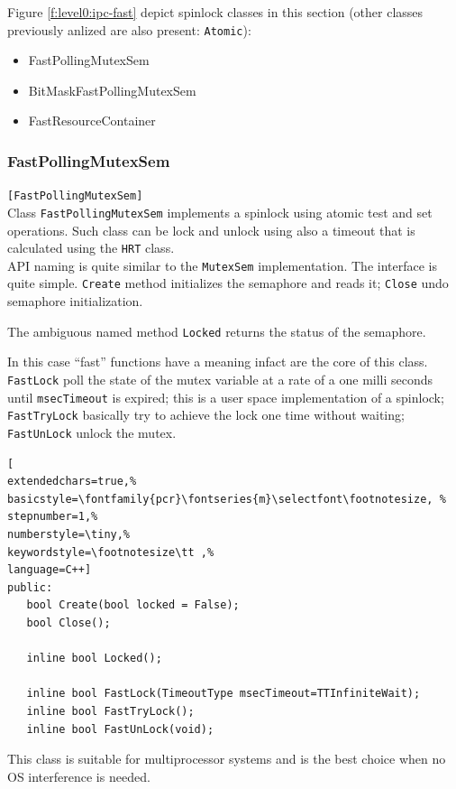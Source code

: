 Figure \ref{f:level0:ipc-fast} depict spinlock classes in this section (other classes previously anlized are also present: \texttt{Atomic}):

\begin{itemize}
 \item FastPollingMutexSem
 \item BitMaskFastPollingMutexSem
 \item FastResourceContainer
\end{itemize}




\subsubsection{FastPollingMutexSem}
\texttt{[FastPollingMutexSem]}\\
Class \texttt{FastPollingMutexSem} implements a spinlock using atomic test and set operations. Such class can be lock and unlock using also a timeout that is calculated using the \texttt{HRT} class.\\


API naming is quite similar to the \texttt{MutexSem} implementation. The interface is quite simple. \texttt{Create} method initializes the semaphore and reads it; \texttt{Close} undo semaphore initialization. 

The ambiguous named method \texttt{Locked} returns the status of the semaphore.

In this case ``fast'' functions have a meaning infact are the core of this class. \texttt{FastLock} poll the state of the mutex variable at a rate of a one milli seconds until \texttt{msecTimeout} is expired; this is a user space implementation of a spinlock; \texttt{FastTryLock} basically try to achieve the lock one time without waiting; \texttt{FastUnLock} unlock the mutex.

\begin{lstlisting}[
extendedchars=true,%
basicstyle=\fontfamily{pcr}\fontseries{m}\selectfont\footnotesize, %
stepnumber=1,%
numberstyle=\tiny,%
keywordstyle=\footnotesize\tt ,%
language=C++]
public:
   bool Create(bool locked = False);
   bool Close();

   inline bool Locked();

   inline bool FastLock(TimeoutType msecTimeout=TTInfiniteWait);
   inline bool FastTryLock();
   inline bool FastUnLock(void);
\end{lstlisting}

This class is suitable for multiprocessor systems and is the best choice when no OS interference is needed.



